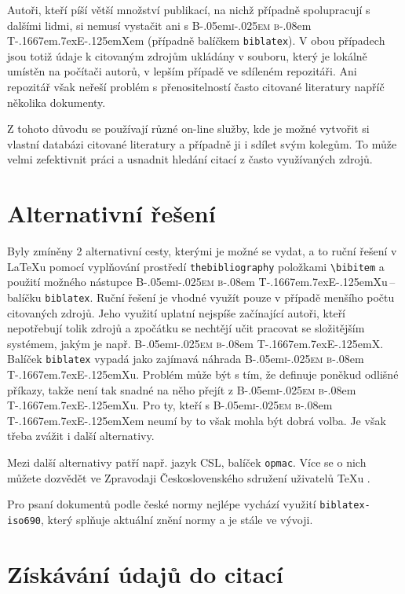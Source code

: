 \documentclass[a4paper, 11pt, final]{article}
\def\BibTeX{\textrm{B\kern-.05em\textsc{i\kern-.025em b}\kern-.08em T\kern-.1667em\lower.7ex\hbox{E}\kern-.125emX}}
\begin{document}
Autoři, kteří píší větší množství publikací, na nichž případně spolupracují s dalšími lidmi, si nemusí
vystačit ani s \BibTeX{}em (případně balíčkem \texttt{biblatex}). V obou případech jsou totiž údaje
k citovaným zdrojům ukládány v souboru, který je lokálně umístěn na počítači autorů, v lepším případě
ve sdíleném repozitáři. Ani repozitář však neřeší problém s přenositelností často citované literatury
napříč několika dokumenty. \cite{sonke-opening-science, thummala-www-bib-tools}

Z tohoto důvodu se používají různé on-line služby, kde je možné vytvořit si vlastní databázi citované
literatury a případně ji i sdílet svým kolegům. To může velmi zefektivnit práci a usnadnit hledání
citací z často využívaných zdrojů. \cite{sonke-opening-science, amjad-jab-ref-ext, thummala-www-bib-tools}

\section{Alternativní řešení}

Byly zmíněny 2 alternativní cesty, kterými je možné se vydat, a to ruční řešení v \LaTeX{}u pomocí
vyplňování prostředí \texttt{thebibliography} položkami \verb|\bibitem| a použití možného nástupce
\BibTeX{}u\,--\,balíčku \texttt{biblatex}. Ruční řešení je vhodné využít pouze v případě menšího
počtu citovaných zdrojů. Jeho využití uplatní nejspíše začínající autoři, kteří nepotřebují tolik
zdrojů a zpočátku se nechtějí učit pracovat se složitějším systémem, jakým je např. \BibTeX{}.
Balíček \texttt{biblatex} vypadá jako zajímavá náhrada \BibTeX{}u. Problém může být s tím,
že definuje poněkud odlišné příkazy, takže není tak snadné na něho přejít z \BibTeX{}u.
Pro ty, kteří s \BibTeX{}em neumí by to však mohla být dobrá volba. Je však třeba zvážit
i další alternativy.

Mezi další alternativy patří např. jazyk CSL, balíček \texttt{opmac}. Více se o nich můžete
dozvědět ve Zpravodaji Československého sdružení uživatelů \TeX{}u \cite{cstug-zpravodaj-2016-1}.

Pro psaní dokumentů podle české normy nejlépe vychází využití \texttt{biblatex-iso690}, který
splňuje aktuální znění normy a je stále ve vývoji. \cite{cstug-zpravodaj-2016-1}

\section{Získávání údajů do citací}
\end{document}
